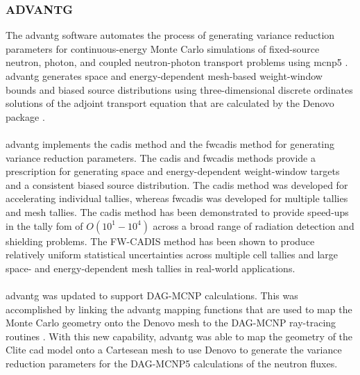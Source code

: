 \documentclass[12pt]{article}
\begin{document}
\subsubsection{ADVANTG}
The \gls{advantg} software automates the 
process of generating variance reduction parameters for continuous-energy Monte 
Carlo simulations of fixed-source neutron, photon, and coupled neutron-photon 
transport problems using \gls{mcnp}5 \cite{advantg}. \gls{advantg} generates 
space and  energy-dependent mesh-based weight-window bounds and biased source 
distributions using three-dimensional discrete ordinates solutions of the 
adjoint transport equation that are calculated by the Denovo package 
\cite{denovo}. 
\\
\\
\gls{advantg} implements the \gls{cadis} method \cite{wagnerNSECADIS} and the 
\gls{fwcadis} method \cite{wagnerNSEFWCADIS} for generating variance reduction 
parameters. The \gls{cadis} and \gls{fwcadis} methods provide a prescription for
generating space and energy-dependent weight-window targets and a consistent 
biased source distribution. The \gls{cadis} method was developed for accelerating
individual tallies, whereas \gls{fwcadis} was developed for multiple tallies and
mesh tallies. The \gls{cadis} method has been demonstrated to provide speed-ups 
in the tally \gls{fom} of $O(10^{1}-10^{4})$ across a broad range of radiation 
detection and shielding problems. The FW-CADIS method has been shown to produce
 relatively uniform statistical uncertainties across multiple cell tallies and 
large space- and energy-dependent mesh tallies in real-world applications.
\\
\\
\gls{advantg} was updated to support DAG-MCNP calculations. This was 
accomplished by linking the \gls{advantg} mapping functions that are used to 
map the Monte Carlo geometry onto the Denovo mesh to the DAG-MCNP 
ray-tracing routines \cite{biondoMC2015}. With this new capability, 
\gls{advantg} was able to map the geometry of the Clite \gls{cad} model onto a 
Cartesean mesh to use Denovo to generate the variance reduction parameters 
for the DAG-MCNP5 calculations of the neutron fluxes.
\end{document}
